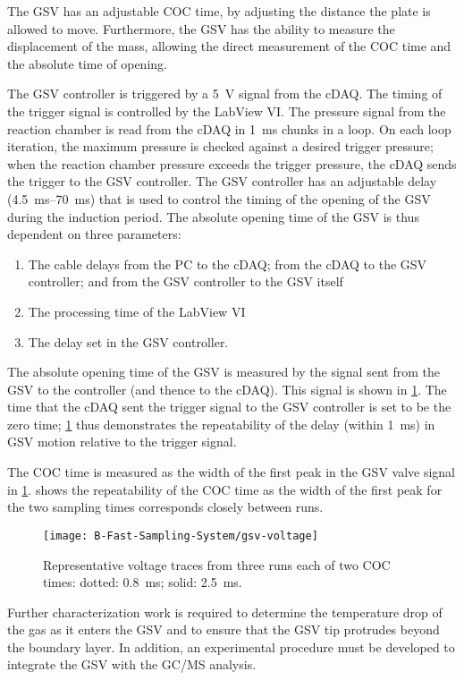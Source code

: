 \documentclass[../main.tex]{subfiles}
\begin{document}
The GSV has an adjustable COC time, by adjusting the
distance the plate is allowed to move. Furthermore, the GSV has the ability
to measure the displacement of the mass, allowing the direct measurement of
the COC time and the absolute time of opening.

The GSV controller is triggered by a \SI{5}{\volt} signal from the cDAQ.
The timing of the trigger signal is controlled by the LabView VI. The pressure
signal from the reaction chamber is read from the cDAQ in \SI{1}{\milli\second}
chunks in a loop. On each loop iteration, the maximum pressure is checked
against a desired trigger pressure; when the reaction chamber pressure exceeds
the trigger pressure, the cDAQ sends the trigger to the GSV controller. The
GSV controller has an adjustable delay (\SIrange{4.5}{70}{\milli\second}) that
is used to control the timing of the opening of the GSV during the induction period.
The absolute opening time of the GSV is thus dependent on three parameters:
\begin{enumerate}
\item The cable delays from the PC to the cDAQ; from the cDAQ to the GSV
      controller; and from the GSV controller to the GSV itself
\item The processing time of the LabView VI
\item The delay set in the GSV controller.
\end{enumerate}

The absolute opening time of the GSV is measured by
the signal sent from the GSV to the controller (and thence to the cDAQ).
This signal is shown in \cref{fig:gsv-voltage}. The time that
the cDAQ sent the trigger signal to the GSV controller is set to be the
zero time; \cref{fig:gsv-voltage} thus demonstrates the
repeatability of the delay (within \SI{1}{\milli\second}) in
GSV motion relative to the trigger signal.

The COC time is measured as the width of the first peak in the
GSV valve signal in \cref{fig:gsv-voltage}. 
shows the repeatability of the COC time as the width of the first
peak for the two sampling times corresponds closely between runs.

\begin{figure}
\texttt{[image: B-Fast-Sampling-System/gsv-voltage]}
\caption{Representative voltage traces from three runs each of two
COC times: dotted: \SI{0.8}{\milli\second}; solid: \SI{2.5}{\milli\second}.}
\label{fig:gsv-voltage}
\end{figure}

Further characterization work is required to determine the temperature
drop of the gas as it enters the GSV and to ensure that the GSV tip
protrudes beyond the boundary layer. In addition, an experimental
procedure must be developed to integrate the GSV with the GC/MS analysis.
\end{document}
